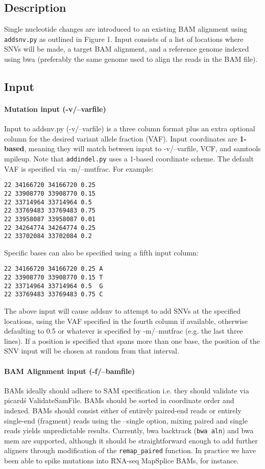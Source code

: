 \documentclass[letterpaper,11pt]{article}
\begin{document}
\begin{verbatim}
\end{verbatim}

\subsection{Description}
    Single nucleotide changes are introduced to an existing BAM alignment using \texttt {addsnv.py} as outlined in Figure 1. Input consists of a list of locations where SNVs will be made, a target BAM alignment, and a reference genome indexed using bwa (preferably the same genome used to align the reads in the BAM file). 

\subsection{Input}
\paragraph{Mutation input (-v/--varfile)}
	Input to addsnv.py (-v/--varfile) is a three column format plus an extra optional column for the desired variant allele fraction (VAF). Input coordinates are \textbf{1-based}, meaning they will match between input to -v/--varfile, VCF, and samtools mpileup. Note that \texttt{addindel.py} uses a 1-based coordinate scheme. The default VAF is specified via -m/--mutfrac. For example:
\begin{verbatim}
22 34166720 34166720 0.25
22 33908770 33908770 0.15
22 33714964 33714964 0.5
22 33769483 33769483 0.75
22 33958087 33958087 0.01
22 34264774 34264774 0.25
22 33702084 33702084 0.2
\end{verbatim}

Specific bases can also be specified using a fifth input column:
\begin{verbatim}
22 34166720 34166720 0.25 A
22 33908770 33908770 0.15 T
22 33714964 33714964 0.5  G
22 33769483 33769483 0.75 C
\end{verbatim}

    The above input will cause addsnv to attempt to add SNVs at the specified locations, using the VAF specified in the fourth column if available, otherwise defaulting to 0.5 or whatever is specified by -m/--mutfrac (e.g. the last three lines). If a position is specified that spans more than one base, the position of the SNV input will be chosen at random from that interval.

\paragraph{BAM Alignment input (-f/--bamfile)}
	BAMs ideally should adhere to SAM specification i.e. they should validate via picard\'s ValidateSamFile. BAMs should be sorted in coordinate order and indexed. BAMs should consist either of entirely paired-end reads or entirely single-end (fragment) reads using the --single option, mixing paired and single reads yields unpredictable results. Currently, bwa backtrack (\texttt{bwa aln}) and bwa mem are supported, although it should be straightforward enough to add further aligners through modification of the \texttt{remap\_paired} function. In practice we have been able to spike mutations into RNA-seq MapSplice BAMs, for instance.
\end{document}
